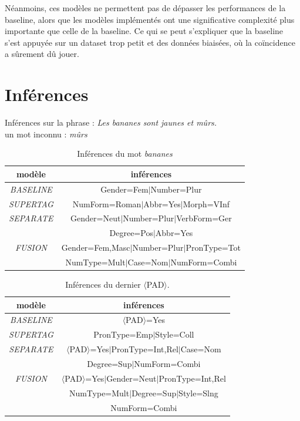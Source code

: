 \documentclass[a4paper]{article}
\begin{document}
Néanmoins, ces modèles ne permettent pas de dépasser les performances de la baseline, alors que les modèles implémentés ont une
significative complexité plus importante que celle de la baseline.
Ce qui se peut s'expliquer que la baseline s'est appuyée sur
un dataset trop petit et des données biaisées, où la coïncidence a sûrement dû jouer. 

\section{Inférences}

Inférences sur la phrase : \textit{Les bananes sont jaunes et mûrs.} \\
un mot inconnu : \textit{mûrs}
\begin{table}[H]
    \centering
    \begin{tabular}{|c|c|}
        \hline
        \textbf{modèle} & \textbf{inférences} \\
        \hline
        \textit{BASELINE} & Gender=Fem$\mid$Number=Plur \\
        \hline
        \textit{SUPERTAG} & NumForm=Roman$\mid$Abbr=Yes$\mid$Morph=VInf\\
        \hline
        \textit{SEPARATE} & Gender=Neut$\mid$Number=Plur$\mid$VerbForm=Ger\\
            & Degree=Pos$\mid$Abbr=Yes\\
        \hline
        \textit{FUSION} & Gender=Fem,Masc$\mid$Number=Plur$\mid$PronType=Tot\\
            & NumType=Mult$\mid$Case=Nom$\mid$NumForm=Combi\\
        \hline
    \end{tabular}
    \caption{Inférences du mot \textit{bananes}}
\end{table}

\begin{table}[H]
    \centering
    \begin{tabular}{|c|c|}
        \hline
        \textbf{modèle} & \textbf{inférences} \\
        \hline
        \textit{BASELINE} & $\langle$PAD$\rangle$=Yes \\
        \hline
        \textit{SUPERTAG} & PronType=Emp$\mid$Style=Coll\\
        \hline
        \textit{SEPARATE} & $\langle$PAD$\rangle$=Yes$\mid$PronType=Int,Rel$\mid$Case=Nom\\
            & Degree=Sup$\mid$NumForm=Combi\\
        \hline
        \textit{FUSION} & $\langle$PAD$\rangle$=Yes$\mid$Gender=Neut$\mid$PronType=Int,Rel\\
            & NumType=Mult$\mid$Degree=Sup$\mid$Style=Slng\\
            & NumForm=Combi\\
        \hline
    \end{tabular}
    \caption{Inférences du dernier $\langle$PAD$\rangle$.}
\end{table} 
\end{document}

